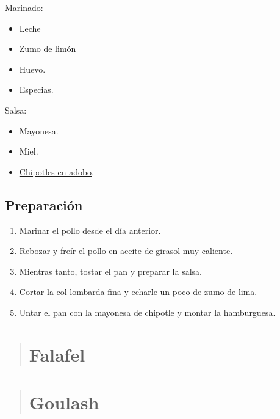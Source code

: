 \documentclass[
]{book}
\providecommand{\tightlist}{%
  \setlength{\itemsep}{0pt}\setlength{\parskip}{0pt}}
\begin{document}
Marinado:

\begin{itemize}
\tightlist
\item
  Leche
\item
  Zumo de limón
\item
  Huevo.
\item
  Especias.
\end{itemize}

Salsa:

\begin{itemize}
\tightlist
\item
  Mayonesa.
\item
  Miel.
\item
  \href{}{Chipotles en adobo}.
\end{itemize}

\hypertarget{preparaciuxf3n-3}{%
\section*{Preparación}\label{preparaciuxf3n-3}}

\begin{enumerate}
\def\labelenumi{\arabic{enumi}.}
\tightlist
\item
  Marinar el pollo desde el día anterior.
\item
  Rebozar y freír el pollo en aceite de girasol muy caliente.
\item
  Mientras tanto, tostar el pan y preparar la salsa.
\item
  Cortar la col lombarda fina y echarle un poco de zumo de lima.
\item
  Untar el pan con la mayonesa de chipotle y montar la hamburguesa.
\end{enumerate}

\begin{quote}
\hypertarget{falafel}{%
\chapter{Falafel}\label{falafel}}
\end{quote}

\begin{quote}
\hypertarget{goulash}{%
\chapter{Goulash}\label{goulash}}
\end{quote}
\end{document}

